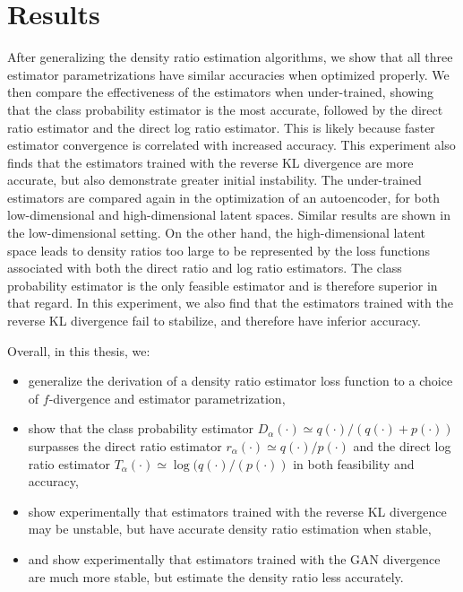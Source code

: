 \documentclass[honours,12pt, twoside]{unswthesis}
\numberwithin{equation}{section}
\theoremstyle{definition}
\begin{document}
\section{Results}
After generalizing the density ratio estimation algorithms, we show that all three estimator parametrizations have similar accuracies when optimized properly. We then compare the effectiveness of the estimators when under-trained, showing that the class probability estimator is the most accurate, followed by the direct ratio estimator and the direct log ratio estimator. This is likely because faster estimator convergence is correlated with increased accuracy. This experiment also finds that the estimators trained with the reverse KL divergence are more accurate, but also demonstrate greater initial instability. The under-trained estimators are compared again in the optimization of an autoencoder, for both low-dimensional and high-dimensional latent spaces. Similar results are shown in the low-dimensional setting. On the other hand, the high-dimensional latent space leads to density ratios too large to be represented by the loss functions associated with both the direct ratio and log ratio estimators. The class probability estimator is the only feasible estimator and is therefore superior in that regard. In this experiment, we also find that the estimators trained with the reverse KL divergence fail to stabilize, and therefore have inferior accuracy.

Overall, in this thesis, we:
\begin{itemize}
\item generalize the derivation of a density ratio estimator loss function to a choice of $f$-divergence and estimator parametrization,
\item show that the class probability estimator $D_\alpha(\cdot)\simeq q(\cdot)/(q(\cdot)+p(\cdot))$ surpasses the direct ratio estimator $r_\alpha(\cdot)\simeq q(\cdot)/p(\cdot)$ and the direct log ratio estimator $T_\alpha(\cdot)\simeq \log (q(\cdot)/(p(\cdot))$ in both feasibility and accuracy,
\item show experimentally that estimators trained with the reverse KL divergence may be unstable, but have accurate density ratio estimation when stable,
\item and show experimentally that estimators trained with the GAN divergence are much more stable, but estimate the density ratio less accurately.
\end{itemize}
\end{document}

